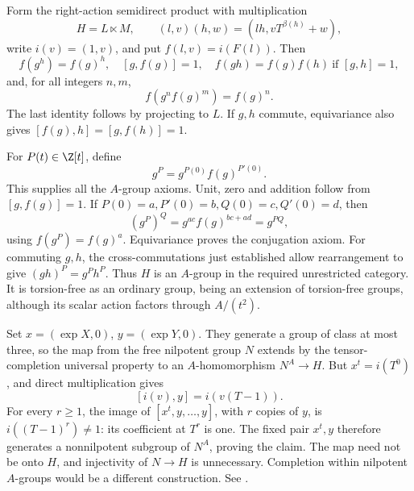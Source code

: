 Form the right-action semidirect product with multiplication
\[
 H=L\ltimes M,\qquad (l,v)(h,w)=(lh,vT^{\beta(h)}+w),
\]
write \(i(v)=(1,v)\), and put \(f(l,v)=i(F(l))\).
Then
\[
 f(g^h)=f(g)^h,\quad [g,f(g)]=1,\quad
 f(gh)=f(g)f(h)\ \text{if }[g,h]=1,
\]
and, for all integers \(n,m\),
\[
 f(g^nf(g)^m)=f(g)^n.
\]
The last identity follows by projecting to \(L\).
If \(g,h\) commute, equivariance also gives
\([f(g),h]=[g,f(h)]=1\).

For \(P(t)\in\Z[t]\), define
\[
 g^P=g^{P(0)}f(g)^{P'(0)}.
\]
This supplies all the \(A\)-group axioms. Unit, zero and addition
follow from \([g,f(g)]=1\).
If \(P(0)=a,P'(0)=b,Q(0)=c,Q'(0)=d\), then
\[
 (g^P)^Q=g^{ac}f(g)^{bc+ad}=g^{PQ},
\]
using \(f(g^P)=f(g)^a\).
Equivariance proves the conjugation axiom. For commuting \(g,h\),
the cross-commutations just established allow rearrangement to give
\((gh)^P=g^Ph^P\).
Thus \(H\) is an \(A\)-group in the required unrestricted category.
It is torsion-free as an ordinary group, being an extension of
torsion-free groups, although its scalar action factors through
\(A/(t^2)\).

Set \(x=(\exp X,0)\), \(y=(\exp Y,0)\).
They generate a group of class at most three, so the map from the
free nilpotent group \(N\) extends by the tensor-completion universal
property to an \(A\)-homomorphism \(N^A\to H\).
But \(x^t=i(T^0)\), and direct multiplication gives
\[
 [i(v),y]=i(v(T-1)).
\]
For every \(r\ge1\), the image of \([x^t,y,\ldots,y]\), with \(r\)
copies of \(y\), is \(i((T-1)^r)\ne1\): its coefficient at \(T^r\)
is one. The fixed pair \(x^t,y\) therefore generates a nonnilpotent
subgroup of \(N^A\), proving the claim.
The map need not be onto \(H\), and injectivity of \(N\to H\) is
unnecessary. Completion within nilpotent \(A\)-groups would be a
different construction. See .
